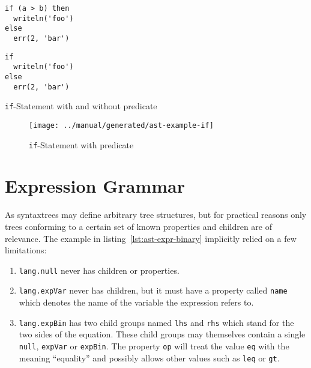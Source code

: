 \documentclass[sigconf,review=true]{acmart}
\newcommand\astScale{0.75}
\begin{document}
\begin{listing}[H]
\begin{minipage}{.20\textwidth}
\begin{verbatim}
if (a > b) then
  writeln('foo')
else
  err(2, 'bar')
\end{verbatim}
\end{minipage}
\begin{minipage}{.20\textwidth}
\begin{verbatim}
if
  writeln('foo')
else
  err(2, 'bar')
\end{verbatim}
\end{minipage}
\caption{\texttt{if}-Statement with and without predicate}
\label{lst:if-stmt-pred}
\end{listing}

\begin{figure*}
  \texttt{[image: ../manual/generated/ast-example-if]}
  \caption{\texttt{if}-Statement with predicate}
  \label{fig:if-stmt-pred}
\end{figure*}

\section{Expression Grammar}

As syntaxtrees may define arbitrary tree structures, but for practical reasons only trees conforming to a certain set of known properties and children are of relevance. The example in listing~\ref{lst:ast-expr-binary} implicitly relied on a few limitations:

\begin{enumerate}
\item \texttt{lang.null} never has children or properties.

\item \texttt{lang.expVar} never has children, but it must have a property called \texttt{name} which denotes the name of the variable the expression refers to.

\item \texttt{lang.expBin} has two child groups named \texttt{lhs} and \texttt{rhs} which stand for the two sides of the equation. These child groups may themselves contain a single \texttt{null}, \texttt{expVar} or \texttt{expBin}. The property \texttt{op} will treat the value \texttt{eq} with the meaning \enquote{equality} and possibly allows other values such as \texttt{leq} or \texttt{gt}.
\end{enumerate}
\end{document}
